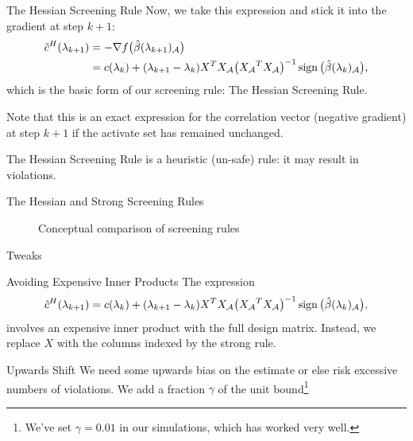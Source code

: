 \documentclass[10pt,ignorenonframetext]{beamer}
\begin{document}
\begin{frame}{The Hessian Screening Rule}
  Now, we take this expression and stick it into the gradient at step \(k +
  1\):
  \begin{equation*}
    \begin{aligned}
      \tilde c^H(\lambda_{k+1})
       & = -\nabla f\big(\hat\beta(\lambda_{k+1})_\mathcal{A}\big)       \\
       & = c(\lambda_k) + (\lambda_{k+1} - \lambda_k)X^T {X_\mathcal{A}}
      \big({X_\mathcal{A}}^T{X_\mathcal{A}}\big)^{-1}
      \operatorname{sign}\big(\hat\beta(\lambda_k)_\mathcal{A}\big),
    \end{aligned}
  \end{equation*}
  which is the basic form of our screening rule: \alert{The Hessian Screening
    Rule}. \medskip

  Note that this is an exact expression for the correlation vector (negative
  gradient) at step \(k+1\) if the activate set has remained unchanged.\medskip

  The Hessian Screening Rule is a heuristic (un-safe) rule: it may result in
  violations.
\end{frame}

\begin{frame}{The Hessian and Strong Screening Rules}
  \begin{figure}
    
    \caption{Conceptual comparison of screening rules}
  \end{figure}
\end{frame}

\begin{frame}{Tweaks}
  \begin{block}{Avoiding Expensive Inner Products}
    The expression
    \begin{equation*}
      \hat c^H(\lambda_{k+1})
      = c(\lambda_k) + (\lambda_{k+1} - \lambda_k)X^T {X_\mathcal{A}}
      \big({X_\mathcal{A}}^T{X_\mathcal{A}}\big)^{-1}
      \operatorname{sign}\big(\hat\beta(\lambda_k)_\mathcal{A}\big),
    \end{equation*}
    involves an expensive inner product with the full design matrix. Instead,
    we replace \(X\) with the columns indexed by the strong rule.
  \end{block}

  \begin{block}{Upwards Shift}
    We need some upwards bias on the estimate or else risk excessive numbers of
    violations. We add a fraction \(\gamma\) of the unit bound\footnote{We've
      set \(\gamma = 0.01\) in our simulations, which has worked very well.}
  \end{block}

\end{frame}
\end{document}
